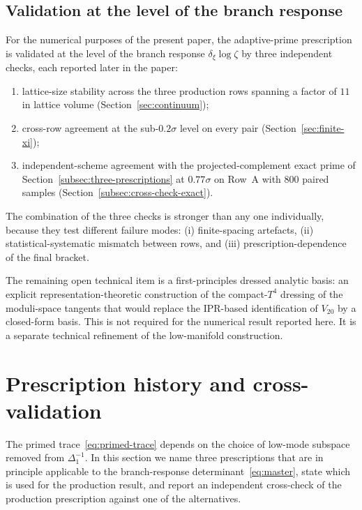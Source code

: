 \documentclass[a4paper,11pt]{article}
\theoremstyle{definition}
\begin{document}
\subsection{Validation at the level of the branch response}
\label{subsec:operational-closure}

For the numerical purposes of the present paper, the adaptive-prime
prescription is validated at the level of the branch response
$\delta_\xi \log\zeta$ by three independent checks, each reported
later in the paper:
\begin{enumerate}
\item[(i)] lattice-size stability across the three production rows
spanning a factor of $11$ in lattice volume
(Section~\ref{sec:continuum});
\item[(ii)] cross-row agreement at the sub-$0.2\sigma$ level on
every pair (Section~\ref{sec:finite-xi});
\item[(iii)] independent-scheme agreement with the
projected-complement exact prime of Section~\ref{subsec:three-prescriptions}
at $0.77\sigma$ on Row~A with $800$ paired samples
(Section~\ref{subsec:cross-check-exact}).
\end{enumerate}
The combination of the three checks is stronger than any one
individually, because they test different failure modes: (i)
finite-spacing artefacts, (ii) statistical-systematic mismatch
between rows, and (iii) prescription-dependence of the final
bracket.

The remaining open technical item is a first-principles dressed
analytic basis: an explicit representation-theoretic construction
of the compact-$T^4$ dressing of the moduli-space tangents that
would replace the IPR-based identification of $V_{20}$ by a
closed-form basis. This is not required for the numerical result
reported here. It is a separate technical refinement of the
low-manifold construction.

\section{Prescription history and cross-validation}
\label{sec:history}

The primed trace~\eqref{eq:primed-trace} depends on the choice of
low-mode subspace removed from $\Delta_1^{-1}$. In this section we
name three prescriptions that are in principle applicable to the
branch-response determinant~\eqref{eq:master}, state which is used
for the production result, and report an independent cross-check of
the production prescription against one of the alternatives.
\end{document}
